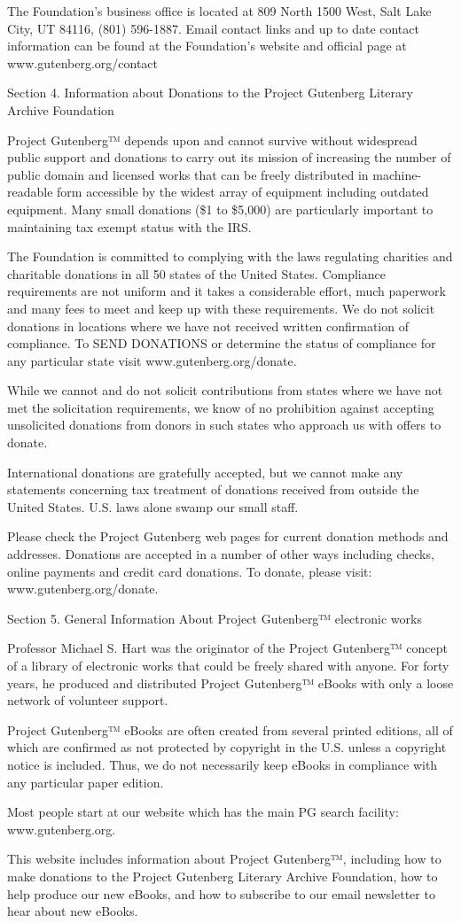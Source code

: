 The Foundation's business office is located at 809 North 1500 West, Salt
Lake City, UT 84116, (801) 596-1887. Email contact links and up to date
contact information can be found at the Foundation's website and
official page at www.gutenberg.org/contact

Section 4. Information about Donations to the Project Gutenberg Literary
Archive Foundation

Project Gutenberg™ depends upon and cannot survive without widespread
public support and donations to carry out its mission of increasing the
number of public domain and licensed works that can be freely
distributed in machine-readable form accessible by the widest array of
equipment including outdated equipment. Many small donations (\$1 to
\$5,000) are particularly important to maintaining tax exempt status
with the IRS.

The Foundation is committed to complying with the laws regulating
charities and charitable donations in all 50 states of the United
States. Compliance requirements are not uniform and it takes a
considerable effort, much paperwork and many fees to meet and keep up
with these requirements. We do not solicit donations in locations where
we have not received written confirmation of compliance. To SEND
DONATIONS or determine the status of compliance for any particular state
visit www.gutenberg.org/donate.

While we cannot and do not solicit contributions from states where we
have not met the solicitation requirements, we know of no prohibition
against accepting unsolicited donations from donors in such states who
approach us with offers to donate.

International donations are gratefully accepted, but we cannot make any
statements concerning tax treatment of donations received from outside
the United States. U.S. laws alone swamp our small staff.

Please check the Project Gutenberg web pages for current donation
methods and addresses. Donations are accepted in a number of other ways
including checks, online payments and credit card donations. To donate,
please visit: www.gutenberg.org/donate.

Section 5. General Information About Project Gutenberg™ electronic works

Professor Michael S. Hart was the originator of the Project Gutenberg™
concept of a library of electronic works that could be freely shared
with anyone. For forty years, he produced and distributed Project
Gutenberg™ eBooks with only a loose network of volunteer support.

Project Gutenberg™ eBooks are often created from several printed
editions, all of which are confirmed as not protected by copyright in
the U.S. unless a copyright notice is included. Thus, we do not
necessarily keep eBooks in compliance with any particular paper edition.

Most people start at our website which has the main PG search facility:
www.gutenberg.org.

This website includes information about Project Gutenberg™, including
how to make donations to the Project Gutenberg Literary Archive
Foundation, how to help produce our new eBooks, and how to subscribe to
our email newsletter to hear about new eBooks.
